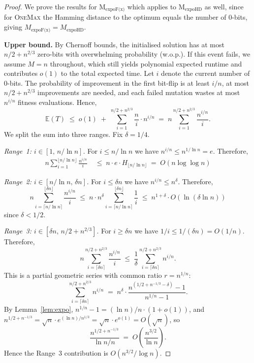 \documentclass[lettersize,journal]{IEEEtran}
\newcommand{\EE}{\mathbb{E}}
\newcommand{\expoF}{M$_{\text{expoF(x)}}$}
\newcommand{\expoHD}{M$_{\text{expoHD}}$}
\begin{document}
\begin{proof}
We prove the results for \expoF{} which applies to \expoHD{} as well, since for \textsc{OneMax} the Hamming distance to the optimum equals the number of 0-bits, giving $M_{\text{expoF(x)}}=M_{\text{expoHD}}$.

\medskip
\noindent\textbf{Upper bound.}
By Chernoff bounds, the initialised solution has at most $n/2+n^{2/3}$ zero-bits with overwhelming probability (w.o.p.). If this event fails, we assume $M=n$ throughout, which still yields polynomial expected runtime and contributes $o(1)$ to the total expected time. Let $i$ denote the current number of 0-bits. The probability of improvement in the first bit-flip is at least $i/n$, at most $n/2+n^{2/3}$ improvements are needed, and each failed mutation wastes at most $n^{i/n}$ fitness evaluations. Hence,
\[
\EE(T) \;\leq\; o(1) \;+\; \sum_{i=1}^{n/2+n^{2/3}} \frac{n}{i}\cdot n^{i/n}
\;=\; n\sum_{i=1}^{n/2+n^{2/3}} \frac{n^{i/n}}{i}.
\]
We split the sum into three ranges. Fix $\delta=1/4$.

\emph{Range~1: $i\in[1,\,n/\ln n]$.}
For $i\leq n/\ln n$ we have $n^{i/n}\leq n^{1/\ln n}=e$.
Therefore,
\begin{align*}
n\sum_{i=1}^{\lfloor n/\ln n\rfloor}\frac{n^{i/n}}{i}
\;&\leq\; n\cdot e\cdot H_{\lfloor n/\ln n\rfloor}
\;=\; O(n\log\log n)
\end{align*}


\emph{Range~2: $i\in[n/\ln n,\,\delta n]$.}
For $i\leq \delta n$ we have $n^{i/n}\leq n^{\delta}$.
Therefore,
\[
n\sum_{i=\lceil n/\ln n\rceil}^{\lfloor\delta n\rfloor}\frac{n^{i/n}}{i}
\;\leq\; n\cdot n^{\delta}\sum_{i=\lceil n/\ln n\rceil}^{\lfloor\delta n\rfloor}\frac{1}{i}
\;\leq\; n^{1+\delta}\cdot O(\ln(\delta\ln n))
\]
since $\delta<1/2$.

\emph{Range~3: $i\in[\delta n,\,n/2+n^{2/3}]$.}
For $i\geq \delta n$ we have $1/i\leq 1/(\delta n)=O(1/n)$.
Therefore,
\[
n\sum_{i=\lceil\delta n\rceil}^{n/2+n^{2/3}}\frac{n^{i/n}}{i}
\;\leq\; \frac{1}{\delta}\sum_{i=\lceil\delta n\rceil}^{n/2+n^{2/3}} n^{i/n}.
\]
This is a partial geometric series with common ratio $r=n^{1/n}$:
\[
\sum_{i=\lceil\delta n\rceil}^{n/2+n^{2/3}} n^{i/n}
\;=\; n^{\delta}\cdot\frac{n^{(1/2+n^{-1/3}-\delta)}-1}{n^{1/n}-1}.
\]
By Lemma~\ref{lem:expo}, $n^{1/n}-1=(\ln n)/n\cdot(1+o(1))$, and $n^{1/2+n^{-1/3}}=\sqrt{n}\cdot e^{(\ln n)/n^{1/3}}=\sqrt{n}\cdot e^{o(1)}=O(\sqrt{n})$, so
\[
\frac{n^{1/2+n^{-1/3}}}{\ln n/n}
\;=\; O\!\left(\frac{n^{3/2}}{\ln n}\right).
\]
Hence the Range~3 contribution is $O(n^{3/2}/\log n)$.


\end{proof}
\end{document}
